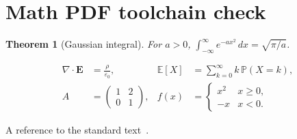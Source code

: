 \documentclass{article}
\newtheorem{theorem}{Theorem}
\begin{document}
\section*{Math PDF toolchain check}
\begin{theorem}[Gaussian integral]
For $a>0$, $\int_{-\infty}^{\infty} e^{-ax^2}\,dx=\sqrt{\pi/a}$.
\end{theorem}
\begin{align}
\nabla\cdot\bm{E}&=\frac{\rho}{\varepsilon_0}, &
\mathbb{E}[X]&=\sum_{k=0}^{\infty}k\,\mathbb{P}(X=k),\\
A&=\begin{pmatrix}1&2\\0&1\end{pmatrix}, &
f(x)&=\begin{cases}x^2&x\geq0,\\-x&x<0.\end{cases}
\end{align}
\begin{center}
\end{center}
A reference to the standard text~\cite{knuth}.


\end{document}
